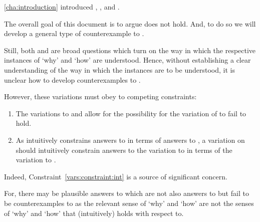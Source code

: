 \begin{note}
  \autoref{cha:introduction} introduced \qWhy{}, \qHow{}, and \issueInclusion{}.

  \begin{quote}
    \vspace{-1.5\baselineskip}
    \questionWhyBasic*
  \end{quote}

  \begin{quote}
    \vspace{-1.5\baselineskip}
    \questionHowBasic*
  \end{quote}

  \begin{quote}
    \vspace{-1.5\baselineskip}
    \issueInclusionFirst*
  \end{quote}
  The overall goal of this document is to argue \issueInclusion{} does not hold.
  And, to do so we will develop a general type of counterexample to \issueInclusion{}.

  Still, both \qWhy{} and \qHow{} are broad questions which turn on the way in which the respective instances of `why' and `how' are understood.
  Hence, without establishing a clear understanding of the way in which the instances are to be understood, it is unclear how to develop counterexamples to \issueInclusion{}.

  However, these variations must obey to competing constraints:

  \begin{enumerate}[label=\alph*., ref=(\alph*)]
  \item
    \label{vars:constraint:ce}
    The variations to \qWhy{} and \qHow{} allow for the possibility for the variation of \issueInclusion{} to fail to hold.
  \item
    \label{vars:constraint:int}
    As \issueInclusion{} intuitively constrains answers to \qWhy{} in terms of answers to \qHow{}, a variation on \issueInclusion{} should intuitively constrain answers to the variation to \qWhy{} in terms of the variation to \qHow{}.
  \end{enumerate}

  Indeed, Constraint~\ref{vars:constraint:int} is a source of significant concern.

  For, there may be plausible answers to \qWhy{} which are not also answers to \qHow{} but fail to be counterexamples to \issueInclusion{} as the relevant sense of `why' and `how' are not the senses of `why' and `how' that \issueInclusion{} (intuitively) holds with respect to.


\end{note}
